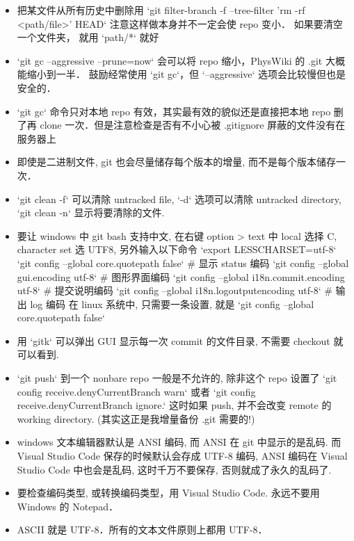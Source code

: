 \begin{itemize}
\item 把某文件从所有历史中删除用 `git filter-branch -f --tree-filter 'rm -rf <path/file>' HEAD` 注意这样做本身并不一定会使 repo 变小． 如果要清空一个文件夹， 就用 `path/*` 就好
\item `git gc --aggressive --prune=now` 会可以将 repo 缩小，PhysWiki 的 .git 大概能缩小到一半． 鼓励经常使用 `git gc`，但 `--aggressive` 选项会比较慢但也是安全的．
\item `git gc` 命令只对本地 repo 有效，其实最有效的貌似还是直接把本地 repo 删了再 clone 一次．但是注意检查是否有不小心被 .gitignore 屏蔽的文件没有在服务器上
\item 即使是二进制文件, git 也会尽量储存每个版本的增量, 而不是每个版本储存一次．
\item `git clean -f` 可以清除 untracked file, `-d` 选项可以清除 untracked directory,  `git clean -n` 显示将要清除的文件.
\item 要让 windows 中 git bash 支持中文, 在右键 option > text 中 local 选择 C, character set 选 UTF8, 另外输入以下命令
`export LESSCHARSET=utf-8`
`git config --global core.quotepath false`          # 显示 status 编码
`git config --global gui.encoding utf-8`            # 图形界面编码
`git config --global i18n.commit.encoding utf-8`    # 提交说明编码
`git config --global i18n.logoutputencoding utf-8`  # 输出 log 编码
在 linux 系统中, 只需要一条设置, 就是
`git config --global core.quotepath false`
\item 用 `gitk` 可以弹出 GUI 显示每一次 commit 的文件目录, 不需要 checkout 就可以看到.
\item `git push` 到一个 nonbare repo 一般是不允许的, 除非这个 repo 设置了 `git config receive.denyCurrentBranch warn` 或者 `git config receive.denyCurrentBranch ignore.` 这时如果 push, 并不会改变 remote 的 working directory. (其实这正是我增量备份 .git 需要的!)
\item windows 文本编辑器默认是 ANSI 编码, 而 ANSI 在 git 中显示的是乱码. 而 Visual Studio Code 保存的时候默认会存成 UTF-8 编码, ANSI 编码在 Visual Studio Code 中也会是乱码, 这时千万不要保存, 否则就成了永久的乱码了.
\item 要检查编码类型, 或转换编码类型，用 Visual Studio Code. 永远不要用 Windows 的 Notepad．
\item ASCII 就是 UTF-8．所有的文本文件原则上都用 UTF-8．
\end{itemize}
